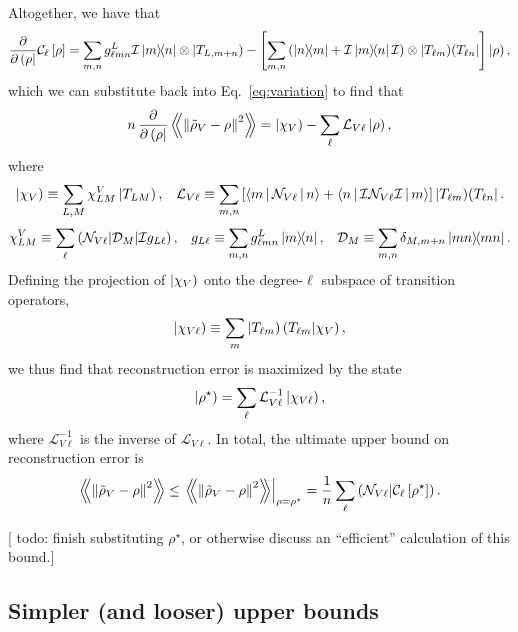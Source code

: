 \documentclass[notitlepage,twocolumn]{revtex4-2}
\newcommand{\f}[2]{\dfrac{#1}{#2}} %
\newcommand{\p}[1]{\left(#1\right)} %
\renewcommand{\sp}[1]{\left[#1\right]} %
\newcommand{\bk}{\Braket} %
\newcommand{\Bbk}[1]
{\left\langle\!\!\left\langle #1 \right\rangle\!\!\right\rangle}
\newcommand{\C}{\mathcal{C}}
\newcommand{\D}{\mathcal{D}}
\newcommand{\I}{\mathcal{I}}
\renewcommand{\L}{\mathcal{L}}
\newcommand{\N}{\mathcal{N}}
\def\obra#1{\mathinner{({#1}|}}
\def\oket#1{\mathinner{|{#1})}}
\def\obk#1{\mathinner{({#1})}}
\def\oop#1#2{\oket{#1}\!\obra{#2}}
\newcommand{\red}[1]{{\color{red} #1}}
\begin{document}
Altogether, we have that
\begin{align}
  \f{\partial}{\partial\obra\rho} \C_\ell\sp{\rho}
  = \sum_{m,n} g_{\ell mn}^L \I\op{m}{n} \otimes \oket{T_{L,m+n}}
  - \sp{\sum_{m,n} \p{\op{n}{m} + \I\op{m}{n}\I}
    \otimes \oop{T_{\ell m}}{T_{\ell n}}} \oket{\rho},
\end{align}
which we can substitute back into Eq.~\eqref{eq:variation} to find that
\begin{align}
  n\, \f{\partial}{\partial\obra\rho}
  \Bbk{\norm{\tilde\rho_V-\rho}^2}
  = \oket{\chi_V} - \sum_\ell \L_{V\ell} \oket\rho,
\end{align}
where
\begin{align}
  \oket{\chi_V} \equiv \sum_{L,M} \chi^V_{LM} \oket{T_{LM}},
  &&
  \L_{V\ell} \equiv \sum_{m,n}
  \sp{\bk{m|\N_{V\ell}|n} + \bk{n|\I\N_{V\ell}\I|m}}
  \oop{T_{\ell m}}{T_{\ell n}}.
\end{align}
\begin{align}
  \chi^V_{LM} \equiv \sum_\ell \obk{\N_{V\ell}|\D_M|\I g_{L\ell}},
  &&
  g_{L\ell} \equiv \sum_{m,n} g^L_{\ell mn} \op{m}{n},
  &&
  \D_M \equiv \sum_{m,n} \delta_{M,m+n} \op{mn}{mn}.
\end{align}
Defining the projection of $\oket{\chi_V}$ onto the degree-$\ell$ subspace of transition operators,
\begin{align}
  \oket{\chi_{V\ell}}
  \equiv \sum_m \oket{T_{\ell m}} \obk{T_{\ell m}|\chi_V},
\end{align}
we thus find that reconstruction error is maximized by the state
\begin{align}
  \oket{\rho^\star} = \sum_\ell \L_{V\ell}^{-1} \oket{\chi_{V\ell}},
\end{align}
where $\L_{V\ell}^{-1}$ is the inverse of $\L_{V\ell}$.
In total, the ultimate upper bound on reconstruction error is
\begin{align}
  \Bbk{\norm{\tilde\rho_V-\rho}^2} \le
  \left. \Bbk{\norm{\tilde\rho_V-\rho}^2} \right|_{\rho=\rho^\star}
  = \f1n \sum_{\ell} \obk{\N_{V\ell}|\C_\ell\sp{\rho^\star}}.
\end{align}

[\red{todo: finish substituting $\rho^\star$, or otherwise discuss an ``efficient'' calculation of this bound.}]

\subsection{Simpler (and looser) upper bounds}
\end{document}
